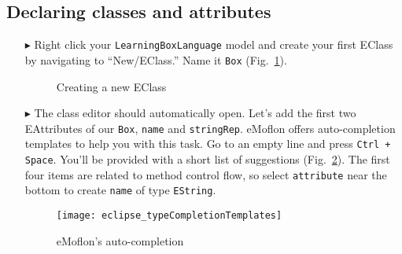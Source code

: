 \newpage
\hypertarget{static:classes tex}{}
\subsection{Declaring classes and attributes}
\texHeader

\begin{itemize}

\item[$\blacktriangleright$] Right click your \texttt{LearningBoxLanguage} model and create your first EClass by navigating to ``New/EClass.'' Name it
\texttt{Box} (Fig.~\ref{eclipse:moslNewClass}).

\begin{figure}[htbp]
	\centering
	\caption{Creating a new EClass}
	\label{eclipse:moslNewClass}
\end{figure} 

\vspace{0.5cm}

\item[$\blacktriangleright$] The class editor should automatically open. Let's add the first two EAttributes of our \texttt{Box}, \texttt{name} and
\texttt{stringRep}. eMoflon offers auto-completion templates to help you with
this task. Go to an empty line and press \texttt{Ctrl + Space}. You'll be
provided with a short list of suggestions (Fig.~\ref{eclipse:typeCompTempl}).
The first four items are related to method control flow, so select \texttt{attribute} near
the bottom to create \texttt{name} of type \texttt{EString}.

\vspace{0.5cm}

\begin{figure}[htbp]
	\centering
  \texttt{[image: eclipse\_typeCompletionTemplates]}
	\caption{eMoflon's auto-completion}
	\label{eclipse:typeCompTempl}
\end{figure} 

\vspace{0.5cm}




\end{itemize}
